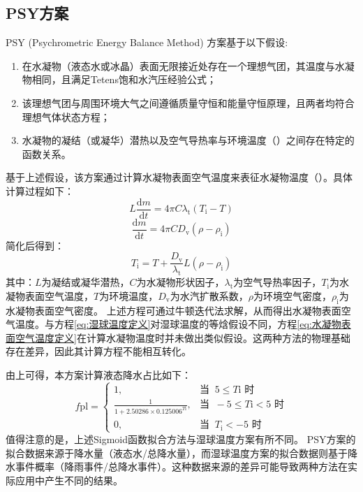 \subsection{PSY方案}
PSY (Psychrometric Energy Balance Method) 方案基于以下假设:
\begin{enumerate}
\item 在水凝物（液态水或冰晶）表面无限接近处存在一个理想气团，其温度与水凝物相同，且满足Tetens饱和水汽压经验公式；
\item 该理想气团与周围环境大气之间遵循质量守恒和能量守恒原理，且两者均符合理想气体状态方程；
\item 水凝物的凝结（或凝华）潜热以及空气导热率与环境温度（\textcelsius）之间存在特定的函数关系。
\end{enumerate}
基于上述假设，该方案通过计算水凝物表面空气温度来表征水凝物温度（\textcelsius）。具体计算过程如下：
\begin{equation}
L\frac{\mathrm{d}m}{\mathrm{d}t} = 4\pi C\lambda_{\mathrm{t}}(T_{\mathrm{i}} - T)
\end{equation}
\begin{equation}
\frac{\mathrm{d}m}{\mathrm{d}t} = 4\pi CD_{\mathrm{v}}(\rho - \rho_{\mathrm{i}})
\end{equation}
简化后得到：
\begin{equation}
\label{eq:水凝物表面空气温度定义}
T_{\mathrm{i}} = T + \frac{D_{\mathrm{v}}}{\lambda_{\mathrm{t}}}L(\rho - \rho_{\mathrm{i}})
\end{equation}
其中：$L$为凝结或凝华潜热，$C$为水凝物形状因子，$\lambda_{\mathrm{t}}$为空气导热率因子，$T_{\mathrm{i}}$为水凝物表面空气温度，$T$为环境温度，$D_{\mathrm{v}}$为水汽扩散系数，$\rho$为环境空气密度，$\rho_{\mathrm{i}}$为水凝物表面空气密度。
上述方程可通过牛顿迭代法求解，从而得出水凝物表面空气温度。与方程\eqref{eq:湿球温度定义}对湿球温度的等焓假设不同，方程\eqref{eq:水凝物表面空气温度定义}在计算水凝物温度时并未做出类似假设。这两种方法的物理基础存在差异，因此其计算方程不能相互转化。


由上可得，本方案计算液态降水占比如下：
\begin{equation}
  f{\mathrm{pl}}= \begin{cases}
    1, & \text{当 }\ 5\leqslant T{\mathrm {i}} \text{ 时}\\
    \frac{1}{1 + 2.50286\times 0.125006^{T{\mathrm{i}}}}, & \text{当 }\ -5\leqslant T{\mathrm {i}} < 5 \text{ 时} \\
    0, & \text{当 }\ T_{\mathrm {i}} < -5 \text{ 时}
  \end{cases}
\end{equation}
值得注意的是，上述Sigmoid函数拟合方法与湿球温度方案有所不同。
PSY方案的拟合数据来源于降水量（液态水/总降水量），而湿球温度方案的拟合数据则基于降水事件概率（降雨事件/总降水事件）。这种数据来源的差异可能导致两种方法在实际应用中产生不同的结果。


